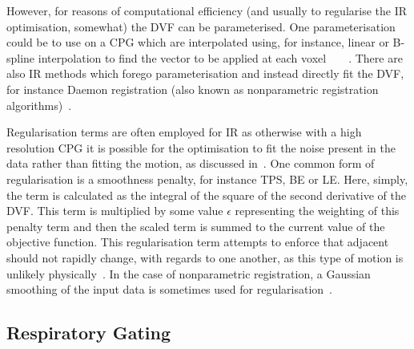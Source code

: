                 However, for reasons of computational efficiency (and usually to regularise the \gls{IR} optimisation, somewhat) the \gls{DVF} can be parameterised. One parameterisation could be to use  on a \gls{CPG} which are interpolated using, for instance, linear or B-spline interpolation to find the vector to be applied at each voxel~~~~. There are also \gls{IR} methods which forego parameterisation and instead directly fit the \gls{DVF}, for instance Daemon registration (also known as nonparametric registration algorithms)~.
                
                Regularisation terms are often employed for  \gls{IR} as otherwise with a high resolution \gls{CPG} it is possible for the optimisation to fit the noise present in the data rather than fitting the motion, as discussed in~. One common form of regularisation is a smoothness penalty, for instance \gls{TPS}, \gls{BE} or \gls{LE}. Here, simply, the term is calculated as the integral of the square of the second derivative of the \gls{DVF}. This term is multiplied by some value $\epsilon$ representing the weighting of this penalty term and then the scaled term is summed to the current value of the objective function. This regularisation term attempts to enforce that adjacent  should not rapidly change, with regards to one another, as this type of motion is unlikely physically~. In the case of nonparametric registration, a Gaussian smoothing of the input data is sometimes used for regularisation~.
        
        \subsection{Respiratory Gating} \label{sec:respiratory_gating}
            
